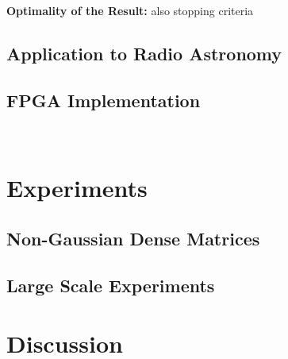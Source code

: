 \documentclass{article}
\begin{document}
{\bf Optimality of the Result:}
also stopping criteria
\subsection{Application to Radio Astronomy}
\subsection{FPGA Implementation}

\newpage
\
\newpage
\section{Experiments}
\subsection{Non-Gaussian Dense Matrices}
\subsection{Large Scale Experiments}
\section{Discussion}








\cite{iht}
\cite{niht}
\cite{greedy_algorithms}
\nocite{langley00}



\end{document}

